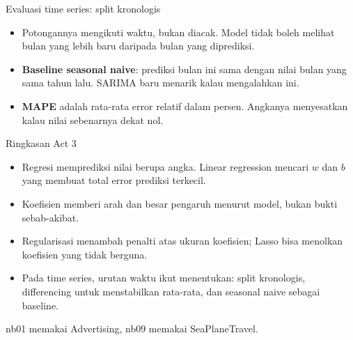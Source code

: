 \documentclass[aspectratio=169,t]{beamer}
\begin{document}
\begin{frame}{Evaluasi time series: split kronologis}
  \vspace{0.7em}
  \begin{center}
  \end{center}
  \vspace{0.9em}
  \begin{itemize}\setlength\itemsep{0.35em}
    \item Potongannya mengikuti waktu, bukan diacak. Model tidak boleh melihat bulan yang
          lebih baru daripada bulan yang diprediksi.
    \item \textbf{Baseline seasonal naive}: prediksi bulan ini sama dengan nilai bulan yang
          sama tahun lalu. SARIMA baru menarik kalau mengalahkan ini.
    \item \textbf{MAPE} adalah rata-rata error relatif dalam persen. Angkanya menyesatkan
          kalau nilai sebenarnya dekat nol.
  \end{itemize}
\end{frame}

\begin{frame}{Ringkasan Act 3}
  \vspace{0.5em}
  \begin{itemize}\setlength\itemsep{0.5em}
    \item Regresi memprediksi nilai berupa angka. Linear regression mencari $w$ dan $b$ yang
          membuat total error prediksi terkecil.
    \item Koefisien memberi arah dan besar pengaruh menurut model, bukan bukti sebab-akibat.
    \item Regularisasi menambah penalti atas ukuran koefisien; Lasso bisa menolkan koefisien
          yang tidak berguna.
    \item Pada time series, urutan waktu ikut menentukan: split kronologis, differencing untuk
          menstabilkan rata-rata, dan seasonal naive sebagai baseline.
  \end{itemize}
  \vspace{0.7em}
  {\footnotesize\color{nvgray}nb01 memakai Advertising, nb09 memakai SeaPlaneTravel.}
\end{frame}
\end{document}
